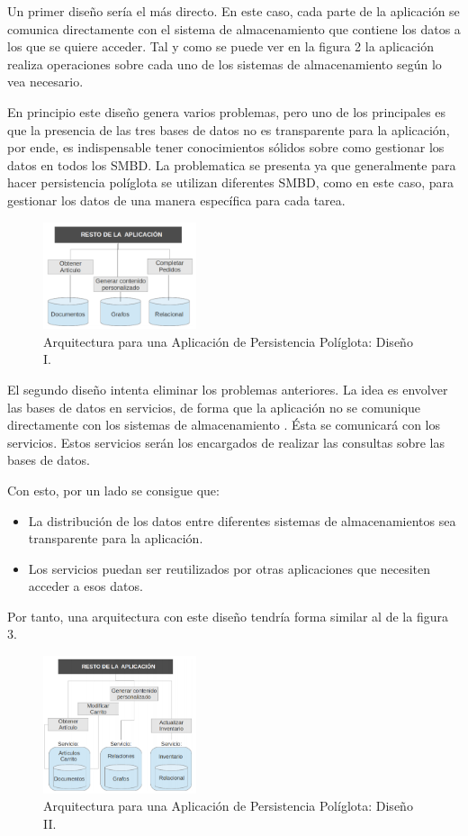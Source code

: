 \documentclass[conference]{IEEEtran}
\begin{document}
Un primer diseño ser\'ia el m\'as directo. En este caso, cada parte de la aplicaci\'on se comunica directamente con el sistema de almacenamiento que contiene los datos a los que se quiere acceder. Tal y como se puede ver en la figura 2 la aplicaci\'on realiza operaciones sobre cada uno de los sistemas de almacenamiento seg\'un lo vea necesario.

En principio este diseño genera varios problemas, pero uno de los principales es que la presencia de las tres bases de datos no es transparente para la aplicaci\'on, por ende, es indispensable tener conocimientos s\'olidos sobre como gestionar los datos en todos los SMBD. La problematica se presenta ya que generalmente para hacer persistencia pol\'iglota se utilizan diferentes SMBD, como en este caso, para gestionar los datos de una manera espec\'ifica para cada tarea.

\begin{figure}[!h]
\centering
\includegraphics[width=0.4\textwidth]{2}
\caption{Arquitectura para una Aplicaci\'on de Persistencia Pol\'iglota: Diseño I.}
\label{fig2}
\end{figure}
El segundo diseño intenta eliminar los problemas anteriores. La idea es envolver las bases de datos en servicios, de forma que la aplicaci\'on no se comunique directamente con los sistemas de almacenamiento  \cite{sistemaAlmacenamiento}. \'Esta se comunicar\'a con los servicios. Estos servicios serán los encargados de realizar las consultas sobre las bases de datos. 

Con esto, por un lado se consigue que:
\begin{itemize}
\item  La distribuci\'on de los datos entre diferentes sistemas de almacenamientos sea transparente para la aplicaci\'on.

\item  Los servicios puedan ser reutilizados por otras aplicaciones que necesiten acceder a esos datos. 
\end{itemize}
Por tanto, una arquitectura con este diseño tendría forma similar al de la figura 3.

\begin{figure}[!h]
\centering
\includegraphics[width=0.4\textwidth]{3}
\caption{Arquitectura para una Aplicaci\'on de Persistencia Pol\'iglota: Diseño II.}
\label{fig3}
\end{figure}
\end{document}

